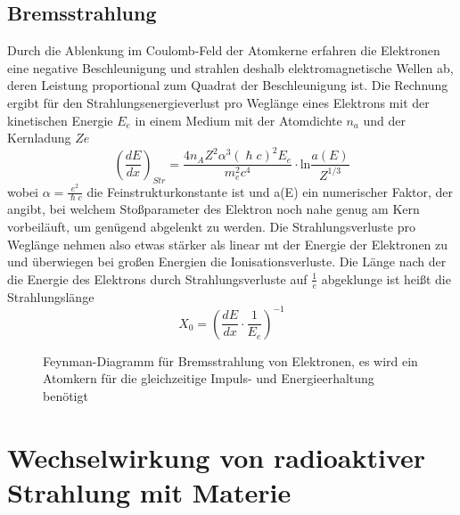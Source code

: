 \documentclass[Ex4_Zusammenfassung.tex]{subfiles}
\begin{document}
\subsection{Bremsstrahlung}
Durch die Ablenkung im Coulomb-Feld der Atomkerne erfahren die Elektronen eine negative Beschleunigung und strahlen deshalb elektromagnetische Wellen ab, deren Leistung proportional zum Quadrat der Beschleunigung ist. Die Rechnung ergibt für den Strahlungsenergieverlust pro Weglänge eines Elektrons mit der kinetischen Energie $E_e$ in einem Medium mit der Atomdichte $n_a$ und der Kernladung $Ze$
\begin{equation}
\left( \frac{dE}{dx} \right)_{Str} = \frac{4 n_A Z^2 \alpha^3 (\hslash c)^2 E_e}{m_e^2 c^4} \cdot \text{ln} \frac{a(E)}{Z^{1/3}} 
\end{equation}
wobei $\alpha = \frac{e^2}{\hslash c} $ die Feinstrukturkonstante ist und a(E) ein numerischer Faktor, der angibt, bei welchem Stoßparameter des Elektron noch nahe genug am Kern vorbeiläuft, um genügend abgelenkt zu werden. Die Strahlungsverluste pro Weglänge nehmen also etwas stärker als linear mt der Energie der Elektronen zu und überwiegen bei großen Energien die Ionisationsverluste. \newline
Die Länge nach der die Energie des Elektrons durch Strahlungsverluste auf $\frac{1}{e} $ abgeklunge ist heißt die Strahlungslänge 
\begin{equation}
X_0 = \left( \frac{dE}{dx} \cdot \frac{1}{E_e} \right)^{-1}
\end{equation}

	\begin{figure}[H]
	\centering
		\caption{Feynman-Diagramm für Bremsstrahlung von Elektronen, es wird ein Atomkern für die gleichzeitige Impuls- und Energieerhaltung benötigt}
	\end{figure}
\newpage
\section{Wechselwirkung von radioaktiver Strahlung mit Materie}
\end{document}
